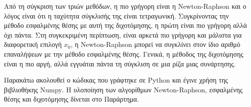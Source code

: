 \documentclass[assignment2.tex]{subfiles}
\begin{document}
Από τη σύγκριση των τριών μεθόδων, η πιο γρήγορη είναι η \textlatin{Newton-Raphson} και ο λόγος είναι ότι η ταχύτητα σύγκλισής της είναι τετραγωνική. Συγκρίνοντας την μέθοδο εσφαλμένης θέσης με αυτή της διχοτόμησης, η πρώτη είναι πιο γρήγορη αλλά όχι πάντα. Στη συγκεκριμένη περίπτωση, είναι αρκετά πιο γρήγορη και μάλιστα για διαφορετική επιλογή $x_0$, η \textlatin{Newton-Raphson} μπορεί να συγκλίνει στον ίδιο αριθμό επαναλήψεων με την μέθοδο εσφαλμένης θέσης. Γενικά, η μέθοδος της διχοτόμησης είναι η πιο αργή, αλλά εγγυάται πάντα τη σύγκλιση σε μια ρίζα μιας συνάρτησης.

Παρακάτω ακολουθεί ο κώδικας που γράφτηκε σε \textlatin{Python} και έγινε χρήση της βιβλιοθήκης \textlatin{Numpy}. Η υλοποίηση των αλγορίθμων \textlatin{Newton-Raphson}, εσφαλμένης θέσης και διχοτόμησης δίνεται στο Παράρτημα.

\end{document}
